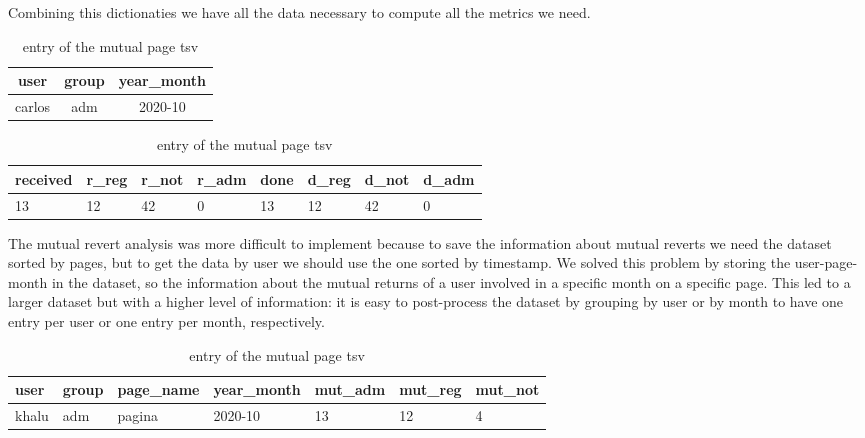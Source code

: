 Combining this dictionaties we have all the data necessary to compute all the metrics we need.
\begin{table}[H]
    \centering
    \begin{tabularx}{\columnwidth}{@{}ccc@{}}
        \midrule
        \textbf{user} & \textbf{group} & \textbf{year\_month} \\ \toprule
        carlos & adm & 2020-10  \\
        
         \bottomrule
    \end{tabularx}
    \begin{tabularx}{\columnwidth}{@{}XXXXXXXX@{}}
        \midrule
        \textbf{received} & \textbf{r\_reg}  & \textbf{r\_not} & \textbf{r\_adm} & \textbf{done} & \textbf{d\_reg} & \textbf{d\_not} & \textbf{d\_adm}\\ \toprule
        13 & 12 & 42  & 0 & 13 & 12 & 42  & 0  \\
        
         \bottomrule
    \end{tabularx}
    
    \caption{entry of the mutual page tsv \label{table:revks}}
\end{table}


The mutual revert analysis was more difficult to implement because to save the information about
mutual reverts we need the dataset sorted by pages, but to get the data by user we should use the
one sorted by timestamp. We solved this problem by storing the user-page-month in the dataset, so
the information about the mutual returns of a user involved in a specific month on a specific page.
This led to a larger dataset but with a higher level of information: it is easy to post-process the dataset
by grouping by user or by month to have one entry per user or one entry per month,
respectively. 


\begin{table}[H]
    \centering
    \begin{tabularx}{\columnwidth}{@{}XXXXXXX@{}}
        \midrule
        \textbf{user} & \textbf{group} & \textbf{page\_name}& \textbf{year\_month} & \textbf{mut\_adm}& \textbf{mut\_reg}& \textbf{mut\_not}\\ \toprule
        khalu & adm & pagina & 2020-10 & 13 & 12 & 4 \\
        
         \bottomrule
    \end{tabularx}

    
    \caption{entry of the mutual page tsv \label{table:rjevks}}
\end{table}







